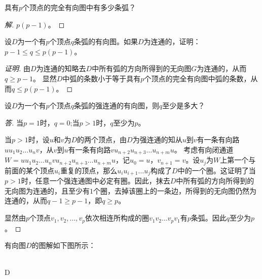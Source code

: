\documentclass{article}
\begin{document}
\begin{CJK}{UTF8}{gbsn}
\begin{Exercise}
  具有$p$个顶点的完全有向图中有多少条弧？
\end{Exercise}
\begin{proof}[解]
  $p(p-1)$。
\end{proof}
\begin{Exercise}
  设$D$为一个有$p$个顶点$q$条弧的有向图。如果$D$为连通的，证明：$p-1\leq q \leq p(p-1)$。
\end{Exercise}
\begin{proof}[证明]
  由$D$为连通的知略去$D$中所有弧的方向所得到的无向图$G$为连通的，从而$q\geq p-1$。
  显然$D$中弧的条数小于等于具有$p$个顶点的完全有向图中弧的条数，从而$q \leq p(p-1)$。
\end{proof}
\begin{Exercise}
  设$D$为一个有$p$个顶点$q$条弧的强连通的有向图，则$q$至少是多大？
\end{Exercise}
\begin{proof}[答]
  当$p=1$时，$q=0$;当$p>1$时，$q$至少为$p$。

  当$p>1$时，设$u$和$v$为$D$的两个顶点，由$D$为强连通的知从$u$到$v$有一条有向路$uu_1u_2\ldots u_nv$，从$v$到$u$有一条有向路$vu_{n+2}u_{n+3}\ldots u_{n+m}u$。
  考虑有向闭通道$W=uu_1u_2\ldots u_nvu_{n+2}u_{n+3}\ldots u_{n+m}u$，记$u_0=u$，$v_{n+1}=v$。设$u_j$为$W$上第一个与前面的某个顶点$u_i$重复的顶点，那么$u_iu_{i+1}\ldots u_j$构成了$D$中的一个圈。这证明了当$p>1$时，任意一个强连通图中必定有圈。因此，抹去$D$中所有弧的方向所得到的无向图为连通的，且至少有$1$个圈，去掉该圈上的一条边，所得到的无向图仍然为连通的，从而$q-1\geq p-1$，即$q\geq p$。

  显然由$p$个顶点$v_1,v_2,\ldots,v_p$依次相连所构成的圈$v_1v_2\ldots v_pv_1$有$p$条弧。因此$q$至少为$p$。
 
\end{proof}

\begin{Exercise}
  有向图$D$的图解如下图所示：
  
  \centering
  \hspace{1cm}\\
 D


\end{Exercise}
\end{CJK}
\end{document}
